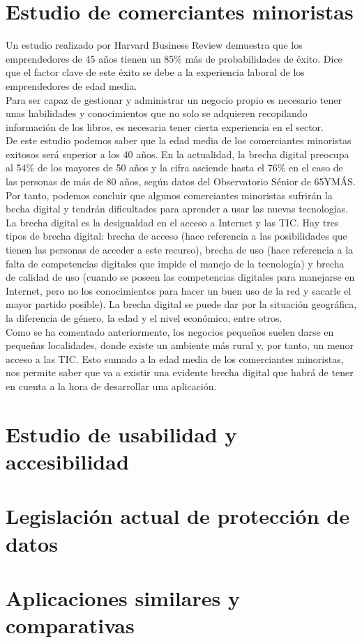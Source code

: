 \section{Estudio de comerciantes minoristas}

Un estudio realizado por Harvard Business Review demuestra que los emprendedores de 45 años tienen un 85\% más de probabilidades de éxito. Dice que el factor clave de este éxito se debe a la experiencia laboral de los emprendedores de edad media. \\

Para ser capaz de gestionar y administrar un negocio propio es necesario tener unas habilidades y conocimientos que no solo se adquieren recopilando información de los libros, es necesaria tener cierta experiencia en el sector. \cite{autonomos2024master} \\

De este estudio podemos saber que la edad media de los comerciantes minoristas exitosos será superior a los 40 años. En la actualidad, la brecha digital preocupa al 54\% de los mayores de 50 años y la cifra asciende hasta el 76\% en el caso de las personas de más de 80 años, según datos del Observatorio Sénior de 65YMÁS. Por tanto, podemos concluir que algunos comerciantes minoristas sufrirán la becha digital y tendrán dificultades para aprender a usar las nuevas tecnologías. \cite{bbva2024brechadigital} \\

La brecha digital es la desigualdad en el acceso a Internet y las TIC. Hay tres tipos de brecha digital: brecha de acceso (hace referencia a las posibilidades que tienen las personas de acceder a este recurso), brecha de uso (hace referencia a la falta de competencias digitales que impide el manejo de la tecnología) y brecha de calidad de uso (cuando se poseen las competencias digitales para manejarse en Internet, pero no los conocimientos para hacer un buen uso de la red y sacarle el mayor partido posible). La brecha digital se puede dar por la situación geográfica, la diferencia de género, la edad y el nivel económico, entre otros. \cite{iberdrolaBrechaDigital} \\

Como se ha comentado anteriormente, los negocios pequeños suelen darse en pequeñas localidades, donde existe un ambiente más rural y, por tanto, un menor acceso a las TIC. Esto sumado a la edad media de los comerciantes minoristas, nos permite saber que va a existir una evidente brecha digital que habrá de tener en cuenta a la hora de desarrollar una aplicación. 


\section{Estudio de usabilidad y accesibilidad}



\section{Legislación actual de protección de datos}

\section{Aplicaciones similares y comparativas}
